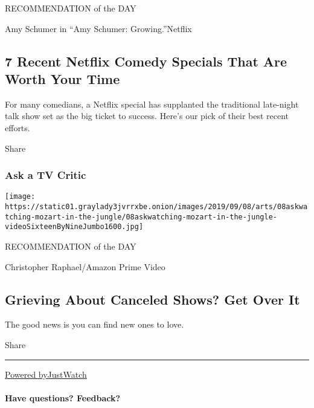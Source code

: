 RECOMMENDATION of the DAY

Amy Schumer in ``Amy Schumer: Growing.''Netflix

\hypertarget{7-recent-netflix-comedy-specials-that-are-worth-your-time}{%
\subsection{7 Recent Netflix Comedy Specials That Are Worth Your
Time}\label{7-recent-netflix-comedy-specials-that-are-worth-your-time}}

For many comedians, a Netflix special has supplanted the traditional
late-night talk show set as the big ticket to success. Here's our pick
of their best recent efforts.

Share

\hypertarget{ask-a-tv-critic}{%
\subsubsection{Ask a TV Critic}\label{ask-a-tv-critic}}

\href{https://www.nytimes3xbfgragh.onion/2019/09/06/arts/television/watching-canceled-shows.html}{}

\texttt{[image: https://static01.graylady3jvrrxbe.onion/images/2019/09/08/arts/08askwatching-mozart-in-the-jungle/08askwatching-mozart-in-the-jungle-videoSixteenByNineJumbo1600.jpg]}

RECOMMENDATION of the DAY

Christopher Raphael/Amazon Prime Video

\hypertarget{grieving-about-canceled-shows-get-over-it}{%
\subsection{Grieving About Canceled Shows? Get Over
It}\label{grieving-about-canceled-shows-get-over-it}}

The good news is you can find new ones to love.

Share

\begin{center}\rule{0.5\linewidth}{\linethickness}\end{center}

\href{https://www.gowatchit.com}{Powered byJustWatch}

\hypertarget{have-questions-feedback}{%
\paragraph{Have questions? Feedback?}\label{have-questions-feedback}}

